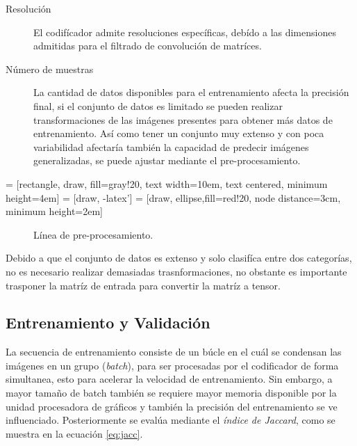 \begin{description}
    \item[Resolución]{ El codifícador admite resoluciones específicas, debído a las dimensiones admitidas para el filtrado de convolución de matríces.}
    \item[Número de muestras]{La cantidad de datos disponibles para el entrenamiento afecta la precisión final, si el conjunto de datos es limitado se pueden realizar transformaciones de las imágenes presentes para obtener más datos de entrenamiento. Así como tener un conjunto muy extenso y con poca variabilidad afectaría también la capacidad de predecir imágenes generalizadas, se puede ajustar mediante el pre-procesamiento.}
    \item[] 
\end{description}


 = [rectangle, draw, fill=gray!20, 
    text width=10em, text centered, minimum height=4em]
 = [draw, -latex']
 = [draw, ellipse,fill=red!20, node distance=3cm,
    minimum height=2em]

\begin{figure}[H]
    \centering
    \caption{Línea de pre-procesamiento.}
    \label{fig: pipeline}
\end{figure}


Debido a que el conjunto de datos es extenso y solo clasifíca entre dos categorías, no es necesario realizar demasiadas trasnformaciones, no obstante es importante trasponer la matríz de entrada para convertir la matríz a tensor.

\subsection{Entrenamiento y Validación}
La secuencia de entrenamiento consiste de un búcle en el cuál se condensan las imágenes en un grupo (\emph{batch}), para ser procesadas por el codificador de forma simultanea, esto para acelerar la velocidad de entrenamiento. Sin embargo, a mayor tamaño de batch también se requiere mayor memoria disponible por la unidad procesadora de gráficos y también la precisión del entrenamiento se ve influenciado. Posteriormente se evalúa mediante el \emph{índice de Jaccard}, como se muestra en la ecuación \ref{eq:jacc}.

